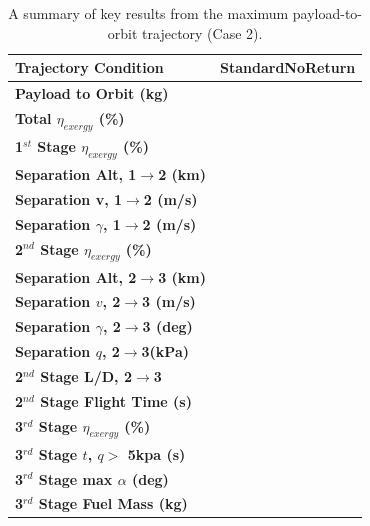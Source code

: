 \begin{table}[ht]
	\centering
\begin{tabular}{l c } 
	\hline \textbf{Trajectory Condition}
	& StandardNoReturn

	\\
	\hline \textbf{Payload to Orbit (kg)}
	& \textbf{\PayloadToOrbitStandardNoReturn}
	\\
	\textbf{Total $\eta_{exergy}$ (\%)}
	& \textbf{\totalExergyEffStandardNoReturn}
	\\
	\hline 
	\textbf{1$^{st}$ Stage $\eta_{exergy}$ (\%)}
	& \textbf{\firstExergyEffStandardNoReturn}
	\\
	\textbf{Separation Alt, 1$\rightarrow$2 (km)}
	& \firstsecondSeparationAltStandardNoReturn
	\\
	\textbf{Separation v, 1$\rightarrow$2 (m/s)}
	& \firstsecondSeparationvStandardNoReturn
	\\
	\textbf{Separation $\gamma$, 1$\rightarrow$2 (m/s)}
	& \firstsecondSeparationgammaStandardNoReturn
	\\
	\hline 
	\textbf{2$^{nd}$ Stage $\eta_{exergy}$ (\%)}
	& \textbf{\secondExergyEffStandardNoReturn}
	\\
	\textbf{Separation Alt, 2$\rightarrow$3 (km)}
	& \secondthirdSeparationAltStandardNoReturn
	\\
	\textbf{Separation $v$, 2$\rightarrow$3 (m/s)}
	& \secondthirdSeparationvStandardNoReturn
	\\
	\textbf{Separation $\gamma$, 2$\rightarrow$3 (deg)}
	& \secondthirdSeparationgammaStandardNoReturn
	\\
	\textbf{Separation $q$, 2$\rightarrow$3(kPa)}
	& \secondthirdSeparationqStandardNoReturn
	\\
	\textbf{2$^{nd}$ Stage L/D, 2$\rightarrow$3}
	& \secondthirdSeparationLDStandardNoReturn
	\\
	\textbf{2$^{nd}$ Stage Flight Time (s)}
	& \secondFlightTimeStandardNoReturn
	\\
	\hline 
	\textbf{3$^{rd}$ Stage $\eta_{exergy}$ (\%)}
	& \textbf{\thirddExergyEffStandardNoReturn}
	\\
	\textbf{3$^{rd}$ Stage $t$, $q >$ 5kpa (s)}
	& \thirdqOverFiveStandardNoReturn
	\\
	\textbf{3$^{rd}$ Stage max $\alpha$ (deg)}
	& \thirdmaxAoAStandardNoReturn
	\\
	\textbf{3$^{rd}$ Stage Fuel Mass (kg)}
	& \thirdmFuelStandardNoReturn
	\\
	\hline 
\end{tabular} 
	\caption{A summary of key results from the maximum payload-to-orbit trajectory (Case 2).}
	\label{tab:summaryStandardNoReturn}
\end{table}







